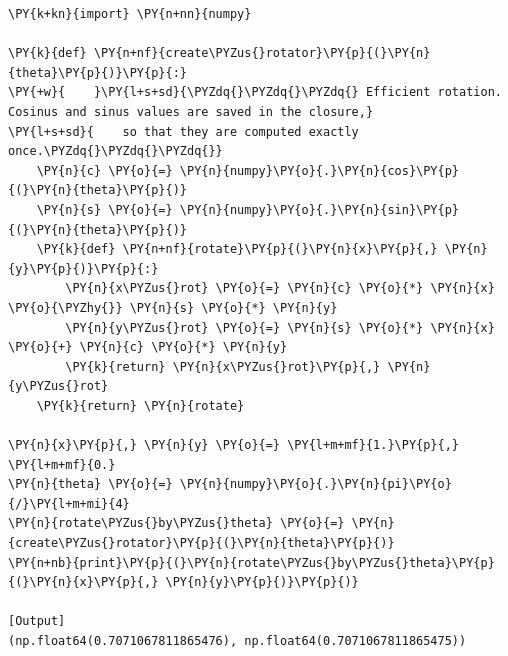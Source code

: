 \begin{Verbatim}[label=\makebox{\url{https://github.com/lucabaldini/cmepda/tree/master/slides/latex/snippets/rotator.py}},commandchars=\\\{\}]
\PY{k+kn}{import} \PY{n+nn}{numpy}

\PY{k}{def} \PY{n+nf}{create\PYZus{}rotator}\PY{p}{(}\PY{n}{theta}\PY{p}{)}\PY{p}{:}
\PY{+w}{    }\PY{l+s+sd}{\PYZdq{}\PYZdq{}\PYZdq{} Efficient rotation. Cosinus and sinus values are saved in the closure,}
\PY{l+s+sd}{    so that they are computed exactly once.\PYZdq{}\PYZdq{}\PYZdq{}}
    \PY{n}{c} \PY{o}{=} \PY{n}{numpy}\PY{o}{.}\PY{n}{cos}\PY{p}{(}\PY{n}{theta}\PY{p}{)}
    \PY{n}{s} \PY{o}{=} \PY{n}{numpy}\PY{o}{.}\PY{n}{sin}\PY{p}{(}\PY{n}{theta}\PY{p}{)}
    \PY{k}{def} \PY{n+nf}{rotate}\PY{p}{(}\PY{n}{x}\PY{p}{,} \PY{n}{y}\PY{p}{)}\PY{p}{:}
        \PY{n}{x\PYZus{}rot} \PY{o}{=} \PY{n}{c} \PY{o}{*} \PY{n}{x} \PY{o}{\PYZhy{}} \PY{n}{s} \PY{o}{*} \PY{n}{y}
        \PY{n}{y\PYZus{}rot} \PY{o}{=} \PY{n}{s} \PY{o}{*} \PY{n}{x} \PY{o}{+} \PY{n}{c} \PY{o}{*} \PY{n}{y}
        \PY{k}{return} \PY{n}{x\PYZus{}rot}\PY{p}{,} \PY{n}{y\PYZus{}rot}
    \PY{k}{return} \PY{n}{rotate}

\PY{n}{x}\PY{p}{,} \PY{n}{y} \PY{o}{=} \PY{l+m+mf}{1.}\PY{p}{,} \PY{l+m+mf}{0.}
\PY{n}{theta} \PY{o}{=} \PY{n}{numpy}\PY{o}{.}\PY{n}{pi}\PY{o}{/}\PY{l+m+mi}{4}
\PY{n}{rotate\PYZus{}by\PYZus{}theta} \PY{o}{=} \PY{n}{create\PYZus{}rotator}\PY{p}{(}\PY{n}{theta}\PY{p}{)}
\PY{n+nb}{print}\PY{p}{(}\PY{n}{rotate\PYZus{}by\PYZus{}theta}\PY{p}{(}\PY{n}{x}\PY{p}{,} \PY{n}{y}\PY{p}{)}\PY{p}{)}

[Output]
(np.float64(0.7071067811865476), np.float64(0.7071067811865475))
\end{Verbatim}